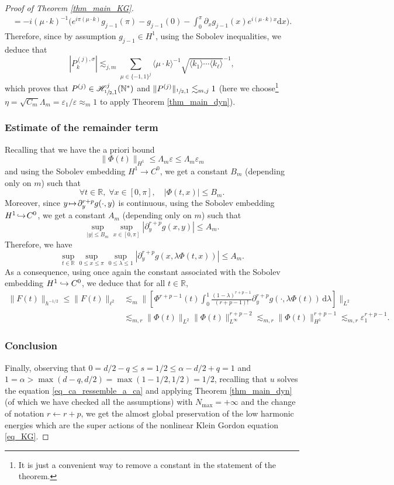 \documentclass[11pt]{article}
\newcommand\mto{\mathchoice{\longmapsto}{\mapsto}{\mapsto}{\mapsto}}
\newcommand\hto{\mathrel{\lhook\joinrel\to}}
\theoremstyle{definition}
\begin{document}
\begin{proof}[Proof of Theorem \ref{thm_main_KG}]
\begin{multline*}
=-i (\mu \cdot k)^{-1} \biggl(e^{i\pi(\mu \cdot k) } g_{j-1}(\pi) - g_{j-1}(0) - \int_0^\pi \partial_x g_{j-1}(x) e^{i(\mu \cdot k) x} \mathrm{d}x \biggr).
\end{multline*}
Therefore, since by assumption $g_{j-1} \in H^1$, using the Sobolev inequalities, we deduce that
\[
|P^{(j),\sigma}_k| \lesssim_{j,m} \sum_{\mu \in \{-1,1\}^j} \langle \mu \cdot k \rangle^{-1} \sqrt{ \langle k_1 \rangle \cdots \langle k_\ell \rangle }^{-1},
\]
which proves that $P^{(j)} \in \mathscr{H}_{\sfrac12,1}^j(\mathbb{N}^*)$ and $\| P^{(j)} \|_{\sfrac12,1} \lesssim_{m,j} 1$ (here we choose\footnote{It is just a convenient way to remove a constant in the statement of the theorem.} $\eta = \sqrt{C_m} \Lambda_m= \varepsilon_1/\varepsilon\approx_m 1$ to apply Theorem \ref{thm_main_dyn}).

\subsubsection*{Estimate of the remainder term}
Recalling that we have the a priori bound
\[
\| \Phi(t) \|_{H^1} \leq \Lambda_m \varepsilon \leq \Lambda_m \varepsilon_m
\]
and using the Sobolev embedding $H^1 \to C^0$, we get a constant $B_m$ (depending only on $m$) such that
\[
\forall t\in \mathbb{R},\; \forall x\in [0,\pi], \quad | \Phi(t,x) | \leq B_m.
\]
Moreover, since $y\!\mto\! \partial_{y}^{r+p} g(\cdot,y)$ is continuous, using the Sobolev embedding \hbox{$H^1\!\hto\!C^0$}, we get a constant $A_m$ (depending only on $m$) such that
\[
\sup_{|y|\leq B_m} \sup_{x\in [0,\pi]} | \partial_{y}^{r+p} g(x,y)| \leq A_m.
\]
Therefore, we have
\[
\sup_{t\in \mathbb{R}} \sup_{0 \leq x \leq \pi} \sup_{0 \leq \lambda \leq 1} |\partial_{y}^{r+p} g(x,\lambda \Phi(t,x))| \leq A_m.
\]
As a consequence, using once again the constant associated with the Sobolev embedding $H^1 \hto C^0$, we deduce that for all $t\in \mathbb{R}$,
\begin{align*}
\| F(t) \|_{h^{-1/2}} \leq \| F(t) \|_{\ell^2} &\lesssim_m \biggl\| \left[\Phi^{r+p-1}(t) \int_0^1 \frac{(1-\lambda)^{r+p-1}}{(r+p-1)!} \partial_{y}^{r+p} g(\cdot,\lambda \Phi(t)) \, \mathrm{d}\lambda \right] \biggr\|_{L^2} \\
&\lesssim_{m,r} \| \Phi(t) \|_{L^2} \| \Phi(t) \|_{L^\infty}^{r+p-2} \lesssim_{m,r} \| \Phi(t) \|_{H^1}^{r+p-1} \lesssim_{m,r} \varepsilon_1^{r+p-1}.
\end{align*}

\subsubsection*{Conclusion}
Finally, observing that $0=d/2-q \leq s=1/2 \leq \alpha - d/2 +q =1 $ and $1=\alpha > \max(d-q,d/2) =\max(1-1/2,1/2)=1/2$, recalling that $u$ solves the equation \eqref{eq_ca_ressemble_a_ca} and applying Theorem \ref{thm_main_dyn} (of which we have checked all the assumptions) with $N_{\max}=+\infty$ and the change of notation $r\leftarrow r+p$, we get the almost global preservation of the low harmonic energies which are the super actions of the nonlinear Klein Gordon equation \eqref{eq_KG}.
\end{proof}
\end{document}
